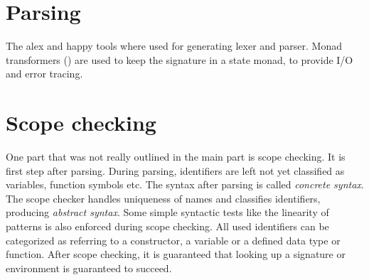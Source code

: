 \section{Parsing}
The alex \cite{alex} and happy \cite{happy} tools where used for generating lexer and parser.
Monad transformers (\cite{Grabmueller2006MonadTransformers}) are used to keep the signature in a state monad,
to provide I/O and error tracing.

\section{Scope checking}
One part that was not really outlined in the main part is scope checking.
It is first step after parsing.
During parsing, identifiers are left not yet classified as variables, function symbols etc.
The syntax after parsing is called \emph{concrete syntax}.
The scope checker handles uniqueness of names and classifies identifiers, producing \emph{abstract syntax}.
Some simple syntactic tests like the linearity of patterns is also enforced during scope checking.
All used identifiers can be categorized as referring to a constructor, a variable or a defined data type or
function. After scope checking, it is guaranteed that looking up a signature or environment is guaranteed to succeed.



